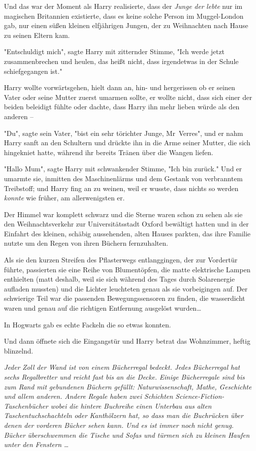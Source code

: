 {Und das war der Moment als Harry realisierte, dass der \emph{Junge der lebte} nur im magischen Britannien existierte, dass es keine solche Person im Muggel-London gab, nur einen süßen kleinen elfjährigen Jungen, der zu Weihnachten nach Hause zu seinen Eltern kam.

"Entschuldigt mich", sagte Harry mit zitternder Stimme, "Ich werde jetzt zusammenbrechen und heulen, das heißt nicht, dass irgendetwas in der Schule schiefgegangen ist."

Harry wollte vorwärtsgehen, hielt dann an, hin- und hergerissen ob er seinen Vater oder seine Mutter zuerst umarmen sollte, er wollte nicht, dass sich einer der beiden beleidigt fühlte oder dachte, dass Harry ihn mehr lieben würde als den anderen --

"Du", sagte sein Vater, "bist ein sehr törichter Junge, Mr~Verres", und er nahm Harry sanft an den Schultern und drückte ihn in die Arme seiner Mutter, die sich hingekniet hatte, während ihr bereits Tränen über die Wangen liefen.

"Hallo Mum", sagte Harry mit schwankender Stimme, "Ich bin zurück." Und er umarmte sie, inmitten des Maschinenlärms und dem Gestank von verbranntem Treibstoff; und Harry fing an zu weinen, weil er wusste, dass nichts so werden \emph{konnte} wie früher, am allerwenigsten er.

Der Himmel war komplett schwarz und die Sterne waren schon zu sehen als sie den Weihnachtsverkehr zur Universitätsstadt Oxford bewältigt hatten und in der Einfahrt des kleinen, schäbig aussehenden, alten Hauses parkten, das ihre Familie nutzte um den Regen von ihren Büchern fernzuhalten.

Als sie den kurzen Streifen des Pflasterwegs entlanggingen, der zur Vordertür führte, passierten sie eine Reihe von Blumentöpfen, die matte elektrische Lampen enthielten (matt deshalb, weil sie sich während des Tages durch Solarenergie aufladen mussten) und die Lichter leuchteten genau als sie vorbeigingen auf. Der schwierige Teil war die passenden Bewegungssensoren zu finden, die wasserdicht waren und genau auf die richtigen Entfernung ausgelöst wurden…

In Hogwarts gab es echte Fackeln die so etwas konnten.

Und dann öffnete sich die Eingangstür und Harry betrat das Wohnzimmer, heftig blinzelnd.

\emph{Jeder Zoll der Wand ist von einem Bücherregal bedeckt. Jedes Bücherregal hat sechs Regalbretter und reicht fast bis an die Decke. Einige Bücherregale sind bis zum Rand mit gebundenen Büchern gefüllt: Naturwissenschaft, Mathe, Geschichte und allem anderen. Andere Regale haben zwei Schichten Science-Fiction-Taschenbücher wobei die hintere Buchreihe einen Unterbau aus alten Taschentuchschachteln oder Kanthölzern hat, so dass man die Buchrücken über denen der vorderen Bücher sehen kann. Und es ist immer noch} \emph{nicht genug. Bücher überschwemmen die Tische und Sofas und türmen sich zu kleinen Haufen unter den Fenstern …}

}
